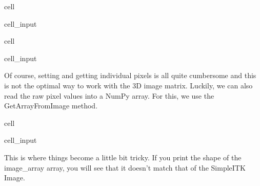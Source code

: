 \documentclass[letterpaper,10pt,english]{jupyterBook}
\begin{document}
\begin{sphinxuseclass}{cell}\begin{sphinxVerbatimInput}

\begin{sphinxuseclass}{cell_input}
\begin{sphinxVerbatim}[commandchars=\\\{\}]
  
\end{sphinxVerbatim}

\end{sphinxuseclass}\end{sphinxVerbatimInput}

\end{sphinxuseclass}
\begin{sphinxuseclass}{cell}\begin{sphinxVerbatimInput}

\begin{sphinxuseclass}{cell_input}
\begin{sphinxVerbatim}[commandchars=\\\{\}]
   
\end{sphinxVerbatim}

\end{sphinxuseclass}\end{sphinxVerbatimInput}

\end{sphinxuseclass}
\sphinxAtStartPar
Of course, setting and getting individual pixels is all quite cumbersome and this is not the optimal way to work with the 3D image matrix. Luckily, we can also read the raw pixel values into a NumPy array. For this, we use the GetArrayFromImage method.

\begin{sphinxuseclass}{cell}\begin{sphinxVerbatimInput}

\begin{sphinxuseclass}{cell_input}
\begin{sphinxVerbatim}[commandchars=\\\{\}]
  
\end{sphinxVerbatim}

\end{sphinxuseclass}\end{sphinxVerbatimInput}

\end{sphinxuseclass}
\sphinxAtStartPar
This is where things become a little bit tricky. If you print the shape of the image\_array array, you will see that it doesn’t match that of the SimpleITK Image.
\end{document}
